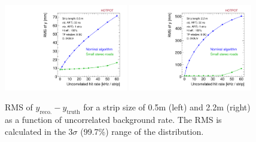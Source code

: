 \begin{figure}[!htpb]
  \begin{center}
    \includegraphics[width=0.48\textwidth]{figures/rms_y_small_vs_rate.pdf}
    \includegraphics[width=0.48\textwidth]{figures/rms_y_large_vs_rate.pdf}
  \end{center}
  \vspace{-10pt}
  \caption{RMS of $y_\text{reco.} - y_\text{truth}$ for a strip size of 0.5m (left) and 2.2m (right) as a function of uncorrelated background rate. The RMS is calculated in the $3\sigma$ (99.7\%) range of the distribution.}
  \label{fig:rms_vs_rate}
\end{figure}

